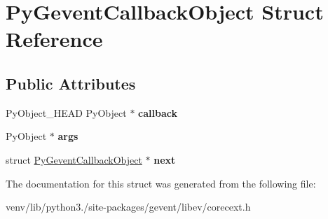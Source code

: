 \hypertarget{struct_py_gevent_callback_object}{}\section{Py\+Gevent\+Callback\+Object Struct Reference}
\label{struct_py_gevent_callback_object}
\subsection*{Public Attributes}
\begin{DoxyCompactItemize}
\item 
\mbox{\label{struct_py_gevent_callback_object_a5c5be901e90d38f2f82ce0ea54f21598}} 
Py\+Object\+\_\+\+H\+E\+AD Py\+Object $\ast$ {\bfseries callback}
\item 
\mbox{\label{struct_py_gevent_callback_object_ae9c30ff998f804ea3c2cbeaa2b537cbc}} 
Py\+Object $\ast$ {\bfseries args}
\item 
\mbox{\label{struct_py_gevent_callback_object_afdea09f9792cce81cea785a8dd92b0dc}} 
struct \hyperlink{struct_py_gevent_callback_object}{Py\+Gevent\+Callback\+Object} $\ast$ {\bfseries next}
\end{DoxyCompactItemize}


The documentation for this struct was generated from the following file\+:\begin{DoxyCompactItemize}
\item 
venv/lib/python3./site-\/packages/gevent/libev/corecext.\+h\end{DoxyCompactItemize}
